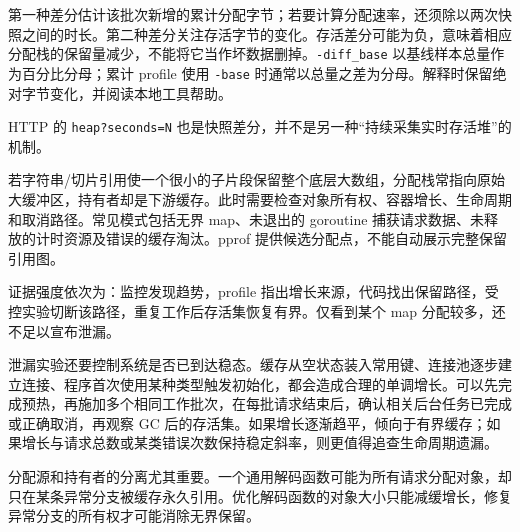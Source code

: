 \documentclass[UTF8,fontset=fandol,openany,11pt]{ctexbook}
\begin{document}
第一种差分估计该批次新增的累计分配字节；若要计算分配速率，还须除以两次快照之间的时长。第二种差分关注存活字节的变化。存活差分可能为负，意味着相应分配栈的保留量减少，不能将它当作坏数据删掉。\texttt{-\allowbreak{}diff\_\allowbreak{}base} 以基线样本总量作为百分比分母；累计 profile 使用 \texttt{-\allowbreak{}base} 时通常以总量之差为分母。解释时保留绝对字节变化，并阅读本地工具帮助。\cite{tools-pprof-cli}

HTTP 的 \texttt{heap?seconds=N} 也是快照差分，并不是另一种“持续采集实时存活堆”的机制。\cite{tools-http-pprof}

若字符串/切片引用使一个很小的子片段保留整个底层大数组，分配栈常指向原始大缓冲区，持有者却是下游缓存。此时需要检查对象所有权、容器增长、生命周期和取消路径。常见模式包括无界 map、未退出的 goroutine 捕获请求数据、未释放的计时资源及错误的缓存淘汰。pprof 提供候选分配点，不能自动展示完整保留引用图。

证据强度依次为：监控发现趋势，profile 指出增长来源，代码找出保留路径，受控实验切断该路径，重复工作后存活集恢复有界。仅看到某个 map 分配较多，还不足以宣布泄漏。

泄漏实验还要控制系统是否已到达稳态。缓存从空状态装入常用键、连接池逐步建立连接、程序首次使用某种类型触发初始化，都会造成合理的单调增长。可以先完成预热，再施加多个相同工作批次，在每批请求结束后，确认相关后台任务已完成或正确取消，再观察 GC 后的存活集。如果增长逐渐趋平，倾向于有界缓存；如果增长与请求总数或某类错误次数保持稳定斜率，则更值得追查生命周期遗漏。

分配源和持有者的分离尤其重要。一个通用解码函数可能为所有请求分配对象，却只在某条异常分支被缓存永久引用。优化解码函数的对象大小只能减缓增长，修复异常分支的所有权才可能消除无界保留。
\end{document}
